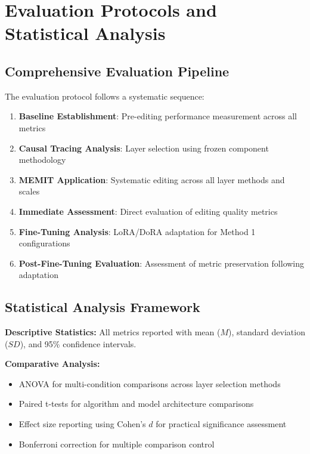 \section{Evaluation Protocols and Statistical Analysis}

\subsection{Comprehensive Evaluation Pipeline}

The evaluation protocol follows a systematic sequence:

\begin{enumerate}
    \item \textbf{Baseline Establishment}: Pre-editing performance measurement across all metrics
    \item \textbf{Causal Tracing Analysis}: Layer selection using frozen component methodology
    \item \textbf{MEMIT Application}: Systematic editing across all layer methods and scales
    \item \textbf{Immediate Assessment}: Direct evaluation of editing quality metrics
    \item \textbf{Fine-Tuning Analysis}: LoRA/DoRA adaptation for Method 1 configurations
    \item \textbf{Post-Fine-Tuning Evaluation}: Assessment of metric preservation following adaptation
\end{enumerate}

\subsection{Statistical Analysis Framework}

\textbf{Descriptive Statistics:} All metrics reported with mean ($M$), standard deviation ($SD$), and 95\% confidence intervals.

\textbf{Comparative Analysis:}
\begin{itemize}
    \item ANOVA for multi-condition comparisons across layer selection methods
    \item Paired t-tests for algorithm and model architecture comparisons  
    \item Effect size reporting using Cohen's $d$ for practical significance assessment
    \item Bonferroni correction for multiple comparison control
\end{itemize}

